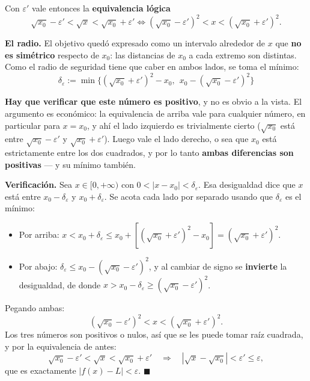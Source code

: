 \documentclass[12pt,a4paper]{article}
\begin{document}
Con $\varepsilon'$ vale entonces la \textbf{equivalencia lógica}
\[
  \sqrt{x_0} - \varepsilon' < \sqrt{x} < \sqrt{x_0} + \varepsilon'
  \iff
  \left(\sqrt{x_0} - \varepsilon'\right)^{2} < x
  < \left(\sqrt{x_0} + \varepsilon'\right)^{2}.
\]

\textbf{El radio.} El objetivo quedó expresado como un intervalo alrededor de
$x$ que \textbf{no es simétrico} respecto de $x_0$: las distancias de $x_0$ a
cada extremo son distintas. Como el radio de seguridad tiene que caber en ambos
lados, se toma el mínimo:
\[
  \boxed{\ \delta_\varepsilon := \min\Big\{
    \left(\sqrt{x_0} + \varepsilon'\right)^{2} - x_0,\ \
    x_0 - \left(\sqrt{x_0} - \varepsilon'\right)^{2} \Big\}\ }
\]



\textbf{Hay que verificar que este número es positivo}, y no es obvio a la
vista. El argumento es económico: la equivalencia de arriba vale para cualquier
número, en particular para $x = x_0$, y ahí el lado izquierdo es trivialmente
cierto ($\sqrt{x_0}$ está entre $\sqrt{x_0}-\varepsilon'$ y
$\sqrt{x_0}+\varepsilon'$). Luego vale el lado derecho, o sea que $x_0$ está
estrictamente entre los dos cuadrados, y por lo tanto \textbf{ambas diferencias
son positivas} --- y su mínimo también.

\textbf{Verificación.} Sea $x \in [0,+\infty)$ con
$0 < |x - x_0| < \delta_\varepsilon$. Esa desigualdad dice que $x$ está entre
$x_0 - \delta_\varepsilon$ y $x_0 + \delta_\varepsilon$. Se acota cada lado por
separado usando que $\delta_\varepsilon$ es el mínimo:

\begin{itemize}
  \item Por arriba:
    $x < x_0 + \delta_\varepsilon
      \leq x_0 + \left[\left(\sqrt{x_0}+\varepsilon'\right)^{2} - x_0\right]
      = \left(\sqrt{x_0}+\varepsilon'\right)^{2}$.
  \item Por abajo:
    $\delta_\varepsilon \leq x_0 - \left(\sqrt{x_0}-\varepsilon'\right)^{2}$, y
    al cambiar de signo se \textbf{invierte} la desigualdad, de donde
    $x > x_0 - \delta_\varepsilon \geq \left(\sqrt{x_0}-\varepsilon'\right)^{2}$.
\end{itemize}

Pegando ambas:
\[
  \left(\sqrt{x_0} - \varepsilon'\right)^{2} < x
  < \left(\sqrt{x_0} + \varepsilon'\right)^{2}.
\]
Los tres números son positivos o nulos, así que se les puede tomar raíz
cuadrada, y por la equivalencia de antes:
\[
  \sqrt{x_0} - \varepsilon' < \sqrt{x} < \sqrt{x_0} + \varepsilon'
  \quad\Longrightarrow\quad
  \left|\sqrt{x} - \sqrt{x_0}\right| < \varepsilon' \leq \varepsilon,
\]
que es exactamente $|f(x) - L| < \varepsilon$. $\blacksquare$
\end{document}
